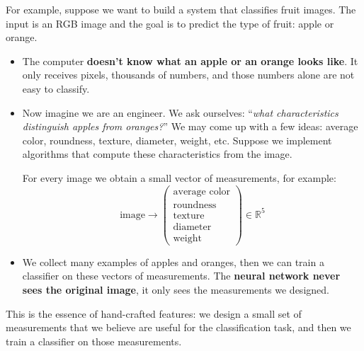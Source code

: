 \highspace
\begin{examplebox}
    For example, suppose we want to build a system that classifies fruit images. The input is an RGB image and the goal is to predict the type of fruit: apple or orange.
    \begin{itemize}
        \item The computer \textbf{doesn't know what an apple or an orange looks like}. It only receives pixels, thousands of numbers, and those numbers alone are not easy to classify.
        
        
        \item Now imagine we are an engineer. We ask ourselves: ``\emph{what characteristics distinguish apples from oranges?}'' We may come up with a few ideas: average color, roundness, texture, diameter, weight, etc. Suppose we implement algorithms that compute these characteristics from the image.
        
        For every image we obtain a small vector of measurements, for example:
        \begin{equation*}
            \text{image} \to \begin{pmatrix}
                \text{average color} \\
                \text{roundness} \\
                \text{texture} \\
                \text{diameter} \\
                \text{weight}
            \end{pmatrix} \in \mathbb{R}^5
        \end{equation*}
        
        
        \item We collect many examples of apples and oranges, then we can train a classifier on these vectors of measurements. The \textbf{neural network never sees the original image}, it only sees the measurements we designed. 
    \end{itemize}
    This is the essence of hand-crafted features: we design a small set of measurements that we believe are useful for the classification task, and then we train a classifier on those measurements.
\end{examplebox}

